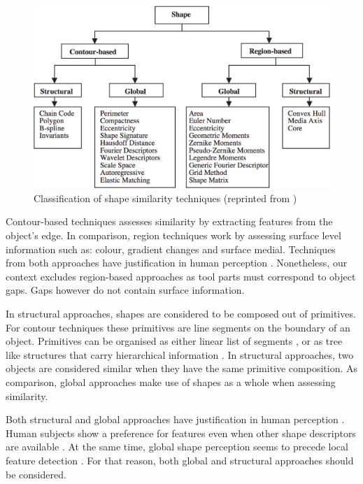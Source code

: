 \documentclass[11]{article}
\let \citeA \textcite
\begin{document}
\begin{figure}[h]
  \centering
  \includegraphics[width=1\textwidth]{figures/similarity_techniques.png}
  \caption{Classification of shape similarity techniques (reprinted from \citeA{zhang2004})}
  \label{fig:shape_similarity}
\end{figure}  

Contour-based techniques assesses similarity by extracting features from the object's edge.
In comparison, region techniques work by assessing surface level information such as: colour, gradient changes and surface medial.
Techniques from both approaches have justification in human perception \cite{chatbri2016}.
Nonetheless, our context excludes region-based approaches as tool parts must correspond to object gaps.
Gaps however do not contain surface information. 

In structural approaches, shapes are considered to be composed out of primitives. For contour techniques these primitives are line segments on the boundary of an object.
Primitives can be organised as either linear list of segments \cite{zhang2004}, or as tree like structures that carry hierarchical information \cite{zhu2015}.
In structural approaches, two objects are considered similar when they have the same primitive composition.
As comparison, global approaches make use of shapes as a whole when assessing similarity. 

Both structural and global approaches have justification in human perception \cite{zhang2004}.
Human subjects show a preference for features even when other shape descriptors are available \cite{chatbri2016}.
At the same time, global shape perception seems to precede local feature detection \cite{navon1977}. 
For that reason, both global and structural approaches should be considered. 
\end{document}
